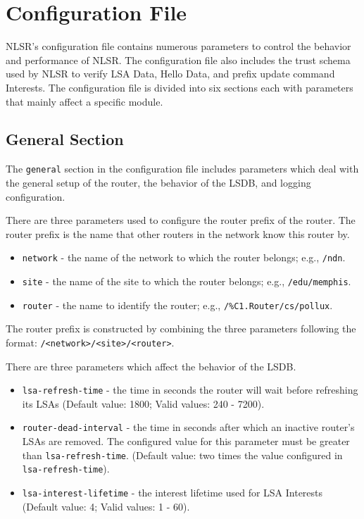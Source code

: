 \section{Configuration File}
\label{sec:configuration}

NLSR's configuration file contains numerous parameters to control the behavior and performance of NLSR.
The configuration file also includes the trust schema used by NLSR to verify LSA Data, Hello Data, and prefix update command Interests.
The configuration file is divided into six sections each with parameters that mainly affect a specific module.

\subsection{General Section}

The \texttt{general} section in the configuration file includes parameters which deal with the general setup of the router, the behavior of the LSDB, and logging configuration.

There are three parameters used to configure the router prefix of the router.
The router prefix is the name that other routers in the network know this router by.
\begin{itemize}
\item \texttt{network} - the name of the network to which the router belongs; e.g., \texttt{/ndn}.
\item \texttt{site} - the name of the site to which the router belongs; e.g., \texttt{/edu/memphis}.
\item \texttt{router} - the name to identify the router; e.g., \texttt{/\%C1.Router/cs/pollux}.
\end{itemize}
The router prefix is constructed by combining the three parameters following the format: \texttt{/<network>/<site>/<router>}.

There are three parameters which affect the behavior of the LSDB.
\begin{itemize}
\item \texttt{lsa-refresh-time} - the time in seconds the router will wait before refreshing its LSAs (Default value: 1800; Valid values: 240 - 7200).
\item \texttt{router-dead-interval} - the time in seconds after which an inactive router's LSAs are removed.
The configured value for this parameter must be greater than \texttt{lsa-refresh-time}. (Default value: two times the value configured in \texttt{lsa-refresh-time}).
\item \texttt{lsa-interest-lifetime} - the interest lifetime used for LSA Interests (Default value: 4; Valid values: 1 - 60).
\end{itemize}

